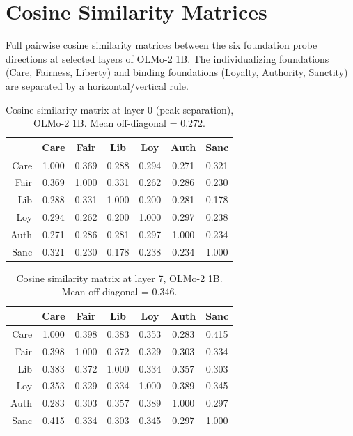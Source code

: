 \section{Cosine Similarity Matrices}\label{cosine-similarity-matrices}

\label{app:cosine}

Full pairwise cosine similarity matrices between the six foundation
probe directions at selected layers of OLMo-2 1B. The
individualizing foundations (Care, Fairness, Liberty) and binding
foundations (Loyalty, Authority, Sanctity) are separated by a
horizontal/vertical rule.

\begin{table}[h]
\centering
\caption{Cosine similarity matrix at layer 0 (peak separation), OLMo-2 1B. Mean off-diagonal = 0.272.}
\label{tab:cosine_l0}
\small
\begin{tabular}{r ccc|ccc}
\toprule
     & Care & Fair & Lib & Loy & Auth & Sanc \\
\midrule
Care & 1.000 & 0.369 & 0.288 & 0.294 & 0.271 & 0.321 \\
Fair & 0.369 & 1.000 & 0.331 & 0.262 & 0.286 & 0.230 \\
Lib  & 0.288 & 0.331 & 1.000 & 0.200 & 0.281 & 0.178 \\
\midrule
Loy  & 0.294 & 0.262 & 0.200 & 1.000 & 0.297 & 0.238 \\
Auth & 0.271 & 0.286 & 0.281 & 0.297 & 1.000 & 0.234 \\
Sanc & 0.321 & 0.230 & 0.178 & 0.238 & 0.234 & 1.000 \\
\bottomrule
\end{tabular}
\end{table}

\begin{table}[h]
\centering
\caption{Cosine similarity matrix at layer 7, OLMo-2 1B. Mean off-diagonal = 0.346.}
\label{tab:cosine_l7}
\small
\begin{tabular}{r ccc|ccc}
\toprule
     & Care & Fair & Lib & Loy & Auth & Sanc \\
\midrule
Care & 1.000 & 0.398 & 0.383 & 0.353 & 0.283 & 0.415 \\
Fair & 0.398 & 1.000 & 0.372 & 0.329 & 0.303 & 0.334 \\
Lib  & 0.383 & 0.372 & 1.000 & 0.334 & 0.357 & 0.303 \\
\midrule
Loy  & 0.353 & 0.329 & 0.334 & 1.000 & 0.389 & 0.345 \\
Auth & 0.283 & 0.303 & 0.357 & 0.389 & 1.000 & 0.297 \\
Sanc & 0.415 & 0.334 & 0.303 & 0.345 & 0.297 & 1.000 \\
\bottomrule
\end{tabular}
\end{table}

